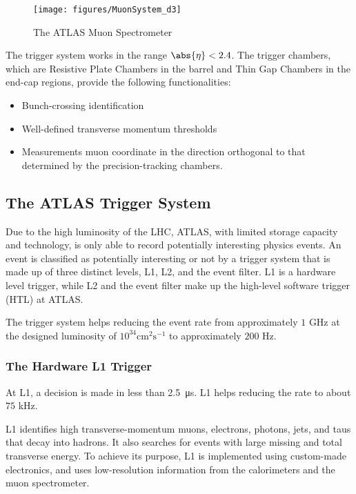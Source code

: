 \begin{figure}[H]
	\texttt{[image: figures/MuonSystem\_d3]}
	\centering
	\caption{The ATLAS Muon Spectrometer}
	\label{f:muons}
\end{figure}

The trigger system works in the range $\abs{\eta} < 2.4$. The trigger chambers,
which are Resistive Plate Chambers in the barrel and Thin Gap Chambers in the
end-cap regions, provide the following functionalities:

\begin{itemize}
	\item Bunch-crossing identification

	\item Well-defined transverse momentum thresholds

	\item Measurements muon coordinate in the direction orthogonal to that
	      determined by the precision-tracking chambers.

\end{itemize}

\subsection{The ATLAS Trigger System}

Due to the high luminosity of the LHC, ATLAS, with limited storage capacity and
technology, is only able to record potentially interesting physics events. An
event is classified as potentially interesting or not by a trigger system that
is made up of three distinct levels, L1, L2, and the event filter. L1 is a
hardware level trigger, while L2 and the event filter make up the high-level
software trigger (HTL) at ATLAS.

The trigger system helps reducing the event rate from approximately $1$ GHz at
the designed luminosity of $10^{34}\text{cm}^2\text{s}^{-1}$ to approximately
$200$ Hz.

\subsubsection{The Hardware L1 Trigger}

At L1, a decision is made in less than \SI{2.5}{\micro\second}. L1 helps
reducing the rate to about $75$ kHz.

L1 identifies high transverse-momentum muons, electrons, photons, jets, and
taus that decay into hadrons. It also searches for events with large missing
and total transverse energy. To achieve its purpose, L1 is implemented using
custom-made electronics, and uses low-resolution information from the
calorimeters and the muon spectrometer.

